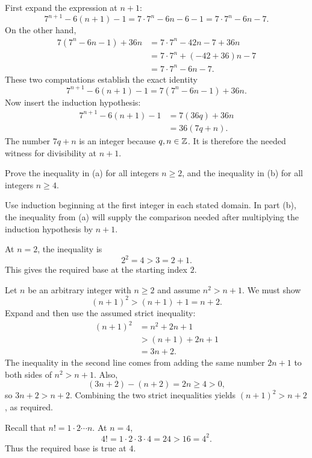 First expand the expression at $n+1$:
\[
 7^{n+1}-6(n+1)-1
 =7\cdot7^n-6n-6-1
 =7\cdot7^n-6n-7.
\]
On the other hand,
\begin{align*}
 7(7^n-6n-1)+36n
 &=7\cdot7^n-42n-7+36n\\
 &=7\cdot7^n+(-42+36)n-7\\
 &=7\cdot7^n-6n-7.
\end{align*}
These two computations establish the exact identity
\[
 7^{n+1}-6(n+1)-1=7(7^n-6n-1)+36n.
\]
Now insert the induction hypothesis:
\begin{align*}
 7^{n+1}-6(n+1)-1
 &=7(36q)+36n\\
 &=36(7q+n).
\end{align*}
The number $7q+n$ is an integer because $q,n\in\mathbb{Z}$. It is therefore
the needed witness for divisibility at $n+1$.



\goal Prove the inequality in (a) for all integers $n\geq2$, and
the inequality in (b) for all integers $n\geq4$.

\idea Use induction beginning at the first integer in each stated
domain. In part (b), the inequality from (a) will supply the comparison
needed after multiplying the induction hypothesis by $n+1$.

At $n=2$, the inequality is
\[
 2^2=4>3=2+1.
\]
This gives the required base at the starting index $2$.

Let $n$ be an arbitrary integer with $n\geq2$ and assume $n^2>n+1$.
We must show
\[
 (n+1)^2>(n+1)+1=n+2.
\]
Expand and then use the assumed strict inequality:
\begin{align*}
 (n+1)^2
 &=n^2+2n+1\\
 &>(n+1)+2n+1\\
 &=3n+2.
\end{align*}
The inequality in the second line comes from adding the same number
$2n+1$ to both sides of $n^2>n+1$. Also,
\[
 (3n+2)-(n+2)=2n\geq4>0,
\]
so $3n+2>n+2$. Combining the two strict inequalities yields
$(n+1)^2>n+2$, as required.


Recall that $n!=1\cdot2\cdots n$. At $n=4$,
\[
 4!=1\cdot2\cdot3\cdot4=24>16=4^2.
\]
Thus the required base is true at $4$.

